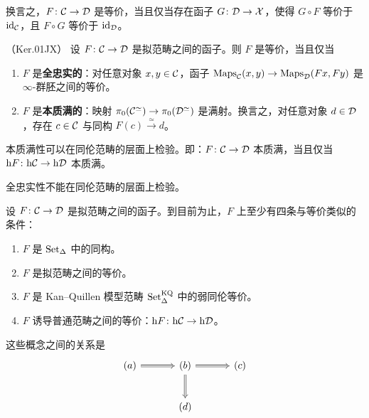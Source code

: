\begin{remark}\label{L5-3.3}
换言之，$F\colon\mathcal{C}\to\mathcal{D}$ 是等价，当且仅当存在函子 $G\colon\mathcal{D}\to\mathcal{X}$，使得 $G\circ F$ 等价于 $\operatorname{id}_{\mathcal{C}}$，且 $F\circ G$ 等价于 $\operatorname{id}_{\mathcal{D}}$。
\end{remark}


\begin{theorem}\label{L5-3.4}（Ker.01JX）
设 $F\colon\mathcal{C}\to\mathcal{D}$ 是拟范畴之间的函子。则 $F$ 是等价，当且仅当
\begin{enumerate}[label=(\arabic*),leftmargin=2.4em,itemsep=0.1em]
\item $F$ 是\textbf{全忠实的}：对任意对象 $x,y\in\mathcal{C}$，函子 $\mathrm{Maps}_{\mathcal{C}}(x,y)\to\mathrm{Maps}_{\mathcal{D}}(Fx,Fy)$ 是 $\infty$-群胚之间的等价。
\item $F$ 是\textbf{本质满的}：映射 $\pi_0(\mathcal{C}^{\simeq})\to\pi_0(\mathcal{D}^{\simeq})$ 是满射。换言之，对任意对象 $d\in\mathcal{D}$，存在 $c\in\mathcal{C}$ 与同构 $F(c)\xrightarrow{\ \simeq\ }d$。
\end{enumerate}
\end{theorem}

\begin{exercise}\label{L5-3.5}
本质满性可以在同伦范畴的层面上检验。即：$F\colon\mathcal{C}\to\mathcal{D}$ 本质满，当且仅当 $\mathrm{h}F\colon\mathrm{h}\mathcal{C}\to\mathrm{h}\mathcal{D}$ 本质满。
\end{exercise}

\begin{exercise}\label{L5-3.6}
全忠实性不能在同伦范畴的层面上检验。
\end{exercise}

\begin{remark}\label{L5-3.7}
设 $F\colon\mathcal{C}\to\mathcal{D}$ 是拟范畴之间的函子。到目前为止，$F$ 上至少有四条与等价类似的条件：
\begin{enumerate}[label=(\alph*),leftmargin=2.4em,itemsep=0.1em]
\item $F$ 是 $\operatorname{Set}_\Delta$ 中的同构。
\item $F$ 是拟范畴之间的等价。
\item $F$ 是 Kan--Quillen 模型范畴 $\operatorname{Set}^{\mathrm{KQ}}_\Delta$ 中的弱同伦等价。
\item $F$ 诱导普通范畴之间的等价：$\mathrm{h}F\colon\mathrm{h}\mathcal{C}\to\mathrm{h}\mathcal{D}$。
\end{enumerate}
这些概念之间的关系是
\[
\begin{tikzcd}[column sep=3.4em,row sep=2.4em]
(a) \arrow[r, Rightarrow] & (b) \arrow[r, Rightarrow] \arrow[d, Rightarrow] & (c)\\
& (d) &
\end{tikzcd}
\]
\end{remark}

